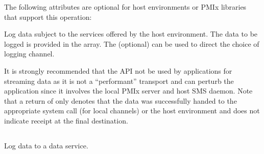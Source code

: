 \reqattrend

\optattrstart
The following attributes are optional for host environments or \ac{PMIx} libraries that support this operation:


\optattrend

\descr

Log data subject to the services offered by the host environment. The data to be logged is provided in the  array. The (optional)  can be used to direct the choice of logging channel.

\adviceuserstart
It is strongly recommended that the  API not be used by applications for streaming data as it is not a ``performant'' transport and can perturb the application since it involves the local \ac{PMIx} server and host \ac{SMS} daemon. Note that a return of  only denotes that the data was successfully handed to the appropriate system call (for local channels) or the host environment and does not indicate receipt at the final destination.
\adviceuserend

\subsection{}

\summary

Log data to a data service.

\format


